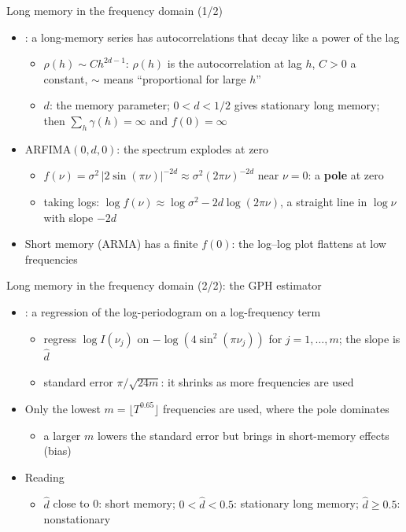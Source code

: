 \begin{frame}{Long memory in the frequency domain (1/2)}
\itemsize{\footnotesize}
\begin{itemize}
    \item {}: a long-memory series has autocorrelations that decay like a power of the lag
    \begin{itemize}
        \item $\rho(h) \sim Ch^{2d-1}$: $\rho(h)$ is the autocorrelation at lag $h$, $C > 0$ a constant, $\sim$ means ``proportional for large $h$''
        \item $d$: the memory parameter; $0 < d < 1/2$ gives stationary long memory; then $\sum_h\gamma(h) = \infty$ and $f(0) = \infty$
    \end{itemize}
    \item ARFIMA$(0,d,0)$: the spectrum explodes at zero
    \begin{itemize}
        \item $f(\nu) = \sigma^2\,|2\sin(\pi\nu)|^{-2d} \approx \sigma^2(2\pi\nu)^{-2d}$ near $\nu = 0$: a \textbf{pole} at zero
        \item taking logs: $\log f(\nu) \approx \log\sigma^2 - 2d\log(2\pi\nu)$, a straight line in $\log\nu$ with slope $-2d$
    \end{itemize}
    \item Short memory (ARMA) has a finite $f(0)$: the log--log plot flattens at low frequencies
\end{itemize}
\end{frame}

\begin{frame}{Long memory in the frequency domain (2/2): the GPH estimator}
\itemsize{\small}
\begin{itemize}
    \item {}: a regression of the log-periodogram on a log-frequency term
    \begin{itemize}
        \item regress $\log I(\nu_j)$ on $-\log(4\sin^2(\pi\nu_j))$ for $j = 1, \ldots, m$; the slope is $\hat d$
        \item standard error $\pi/\sqrt{24m}$: it shrinks as more frequencies are used
    \end{itemize}
    \item Only the lowest $m = \lfloor T^{0.65}\rfloor$ frequencies are used, where the pole dominates
    \begin{itemize}
        \item a larger $m$ lowers the standard error but brings in short-memory effects (bias)
    \end{itemize}
    \item Reading
    \begin{itemize}
        \item $\hat d$ close to 0: short memory; $0 < \hat d < 0.5$: stationary long memory; $\hat d \ge 0.5$: nonstationary
    \end{itemize}
\end{itemize}
\end{frame}

